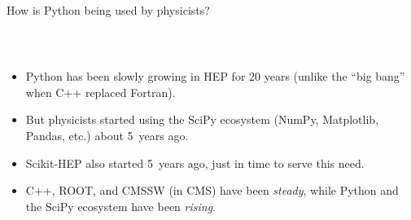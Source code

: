 \documentclass[aspectratio=169]{beamer}
\begin{document}
\begin{frame}{How is Python being used by physicists?}
\vspace{0.25 cm}
\textcolor{darkblue}{\mbox{\hspace{-0.5 cm}}}

\vspace{-0.35 cm}
\begin{columns}
\end{columns}
\end{frame}

\begin{frame}{\mbox{ }}
\large
\begin{itemize}\setlength{\itemsep}{0.25 cm}
\item<1-> Python has been slowly growing in HEP for 20 years (unlike the ``big bang'' when C++ replaced Fortran).
\item<2-> But physicists started using the SciPy ecosystem (NumPy, Matplotlib, Pandas, etc.) about 5~years ago.
\item<3-> Scikit-HEP also started 5~years ago, just in time to serve this need.
\item<4-> C++, ROOT, and CMSSW (in CMS) have been {\it steady}, while Python and the SciPy ecosystem have been {\it rising}.
\end{itemize}
\end{frame}
\end{document}
